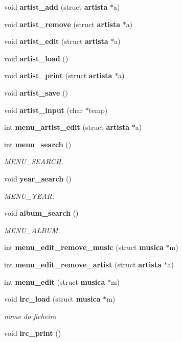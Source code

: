 \begin{DoxyCompactItemize}
void \textbf{ artist\+\_\+add} (struct \textbf{ artista} $\ast$a)
\item 
void \textbf{ artist\+\_\+remove} (struct \textbf{ artista} $\ast$a)
\item 
void \textbf{ artist\+\_\+edit} (struct \textbf{ artista} $\ast$a)
\item 
void \textbf{ artist\+\_\+load} ()
\item 
void \textbf{ artist\+\_\+print} (struct \textbf{ artista} $\ast$a)
\item 
void \textbf{ artist\+\_\+save} ()
\item 
void \textbf{ artist\+\_\+input} (char $\ast$temp)
\item 
int \textbf{ menu\+\_\+artist\+\_\+edit} (struct \textbf{ artista} $\ast$a)
\item 
int \textbf{ menu\+\_\+search} ()
\begin{DoxyCompactList}\small\item\em M\+E\+N\+U\+\_\+\+S\+E\+A\+R\+CH. \end{DoxyCompactList}\item 
void \textbf{ year\+\_\+search} ()
\begin{DoxyCompactList}\small\item\em M\+E\+N\+U\+\_\+\+Y\+E\+AR. \end{DoxyCompactList}\item 
void \textbf{ album\+\_\+search} ()
\begin{DoxyCompactList}\small\item\em M\+E\+N\+U\+\_\+\+A\+L\+B\+UM. \end{DoxyCompactList}\item 
int \textbf{ menu\+\_\+edit\+\_\+remove\+\_\+music} (struct \textbf{ musica} $\ast$m)
\item 
int \textbf{ menu\+\_\+edit\+\_\+remove\+\_\+artist} (struct \textbf{ artista} $\ast$a)
\item 
int \textbf{ menu\+\_\+edit} (struct \textbf{ musica} $\ast$m)
\item 
void \textbf{ lrc\+\_\+load} (struct \textbf{ musica} $\ast$m)
\begin{DoxyCompactList}\small\item\em nome do ficheiro \end{DoxyCompactList}\item 
void \textbf{ lrc\+\_\+print} ()
\end{DoxyCompactItemize}
